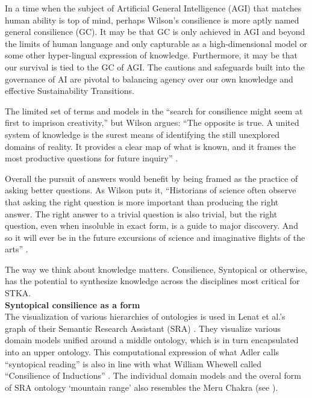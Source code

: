 In a time when the subject of Artificial General Intelligence (AGI) that matches human ability is top of mind, perhaps Wilson’s consilience is more aptly named general consilience (GC). It may be that GC is only achieved in AGI and beyond the limits of human language and only capturable as a high-dimensional model or some other hyper-lingual expression of knowledge. Furthermore, it may be that our survival is tied to the GC of AGI. The cautions and safeguards built into the governance of AI are pivotal to balancing agency over our own knowledge and effective Sustainability Transitions. 

The limited set of terms and models in the “search for consilience might seem at first to imprison creativity,” but Wilson argues: “The opposite is true. A united system of knowledge is the surest means of identifying the still unexplored domains of reality. It provides a clear map of what is known, and it frames the most productive questions for future inquiry” \citep[p. 295]{wilson_consilience_1999}.

Overall the pursuit of answers would benefit by being framed as the practice of asking better questions. As Wilson puts it, “Historians of science often observe that asking the right question is more important than producing the right answer. The right answer to a trivial question is also trivial, but the right question, even when insoluble in exact form, is a guide to major discovery. And so it will ever be in the future excursions of science and imaginative flights of the arts” \citep[p. 295]{wilson_consilience_1999}. 

The way we think about knowledge matters. Consilience, Syntopical or otherwise, has the potential to synthesize knowledge across the disciplines most critical for  STKA. \\
\textbf{Syntopical consilience as a form} \\
The visualization of various hierarchies of ontologies is used in Lenat et al.’s graph of their Semantic Research Assistant (SRA) \citep[p. 7]{lenat_harnessing_2010}. They visualize various domain models unified around a middle ontology, which is in turn encapsulated into an upper ontology. This computational expression of what Adler calls “syntopical reading” is also in line with what William Whewell called “Consilience of Inductions” \citep{snyder_william_2023,hepburn_scientific_2021}. The individual domain models and the overal form of SRA ontology ‘mountain range’ also resembles the Meru Chakra (see \citep{fortton_golden_nodate}).


